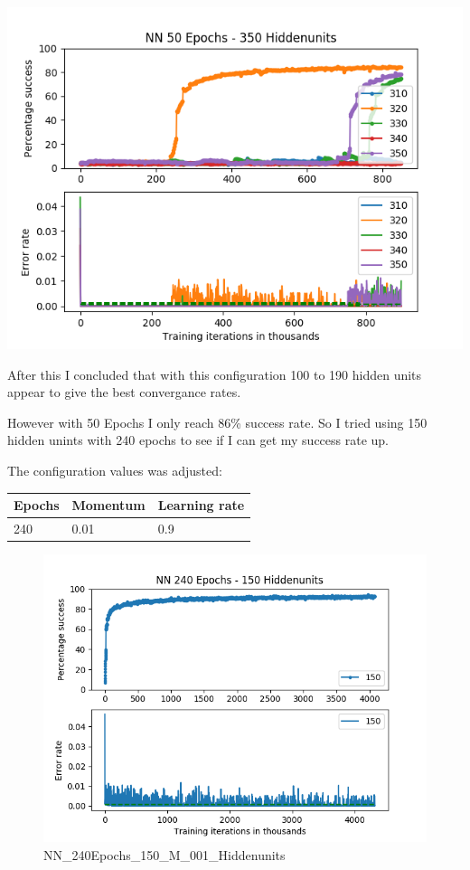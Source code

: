 \documentclass[11pt]{article}
\makeatletter
\def\maxwidth{\ifdim\Gin@nat@width>\linewidth\linewidth
    \else\Gin@nat@width\fi}
\let\Oldincludegraphics\includegraphics
\renewcommand{\includegraphics}[1]{\Oldincludegraphics[width=.8\maxwidth]{#1}}
\makeatother
\begin{document}
\includegraphics{50Epochs_Momentum_03_Experiment3/NN_50Epochs_350Hiddenunits.png}

After this I concluded that with this configuration 100 to 190 hidden
units appear to give the best convergance rates.

However with 50 Epochs I only reach 86\% success rate. So I tried using
150 hidden unints with 240 epochs to see if I can get my success rate
up.

The configuration values was adjusted:

\begin{longtable}[]{@{}lll@{}}
\toprule
Epochs & Momentum & Learning rate\tabularnewline
\midrule
\endhead
240 & 0.01 & 0.9\tabularnewline
\bottomrule
\end{longtable}

\begin{figure}
\centering
\includegraphics{NN_240Epochs_150_M_001_Hiddenunits.png}
\caption{NN\_240Epochs\_150\_M\_001\_Hiddenunits}
\end{figure}
\end{document}
